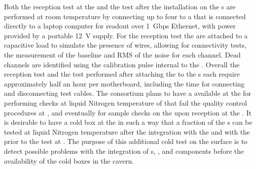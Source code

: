 Both the reception test at the  and the test after the
installation on the s are performed at room temperature 
by connecting up to four  to a  that is 
connected directly to a laptop computer for readout over 1~Gbps
Ethernet, with power provided by a portable 12~V supply. For 
the reception test the  are attached to a capacitive 
load to simulate the presence of wires, allowing for connectivity 
tests, the measurement of the baseline and RMS of the noise for 
each channel. Dead channels are identified using the calibration 
pulse internal to the  . Overall the reception 
test and the test performed after attaching the  to the 
s each require approximately half an hour per motherboard, 
including  the time for connecting and disconnecting test cables.
The  consortium plans to have a  available
at the  for performing checks at liquid Nitrogen temperature
of  that fail the quality control procedures at \surf,
and eventually for sample checks on the  upon reception
at the . It is desirable to have a cold box at the 
in such a way that a fraction of the s can be tested at
liquid Nitrogen temperature after the integration with the 
and with the  prior to the test at 
\surf. The purpose of this additional cold test on the surface is to
detect possible problems with the integration of s, ,
and  components before the availability of the cold
boxes in the \surf cavern.

